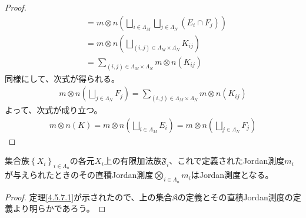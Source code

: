\documentclass[dvipdfmx]{jsarticle}
\begin{document}
\begin{proof}
\begin{align*}
&= m \otimes n\left( \bigsqcup_{i \in \varLambda_{M}} {\bigsqcup_{j \in \varLambda_{N}} \left( E_{i} \cap F_{j} \right)} \right)\\
&= m \otimes n\left( \bigsqcup_{(i,j) \in \varLambda_{M} \times \varLambda_{N}} K_{ij} \right)\\
&= \sum_{(i,j) \in \varLambda_{M} \times \varLambda_{N}} {m \otimes n\left( K_{ij} \right)}
\end{align*}
同様にして、次式が得られる。
\begin{align*}
m \otimes n\left( \bigsqcup_{j \in \varLambda_{N}} F_{j} \right) = \sum_{(i,j) \in \varLambda_{M} \times \varLambda_{N}} {m \otimes n\left( K_{ij} \right)}
\end{align*}
よって、次式が成り立つ。
\begin{align*}
m \otimes n(K) = m \otimes n\left( \bigsqcup_{i \in \varLambda_{M}} E_{i} \right) = m \otimes n\left( \bigsqcup_{j \in \varLambda_{N}} F_{j} \right)
\end{align*}
\end{proof}
\begin{thm}\label{4.5.7.2} 集合族$\left\{ X_{i} \right\}_{i \in \varLambda_{n} }$の各元$X_{i}$上の有限加法族$\mathfrak{F}_{i}$、これで定義されたJordan測度$m_{i}$が与えられたときのその直積Jordan測度$\bigotimes_{i \in \varLambda_{n}} m_{i}$はJordan測度となる。
\end{thm}
\begin{proof} 定理\ref{4.5.7.1}が示されたので、上の集合$\mathfrak{K}$の定義とその直積Jordan測度の定義より明らかであろう。
\end{proof}
\end{document}
